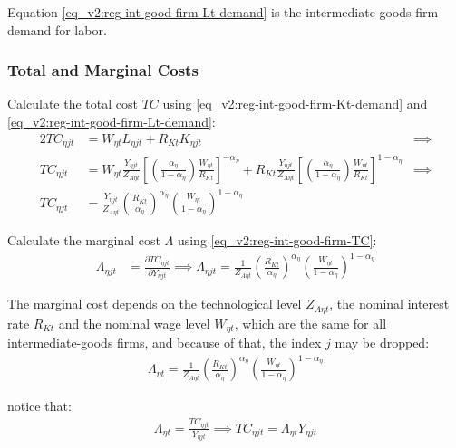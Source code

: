 \documentclass[../thesis.tex]{subfiles}
\begin{document}
Equation \ref{eq_v2:reg-int-good-firm-Lt-demand} is the intermediate-goods firm demand for labor.

\subsubsection*{Total and Marginal Costs}

Calculate the total cost $TC$ using \ref{eq_v2:reg-int-good-firm-Kt-demand} and \ref{eq_v2:reg-int-good-firm-Lt-demand}:
\begin{alignat}{2}
	TC_{\eta jt} & = W_{\eta t} L_{\eta jt} + R_{Kt} K_{\eta jt} &\implies \nonumber \\
	TC_{\eta jt} & = W_{\eta t} \frac{Y_{\eta jt}}{Z_{A\eta t}} \left[ \left( \frac{{\alpha_{\eta}}}{1-\alpha_{\eta}} \right) \frac{W_{\eta t}}{R_{Kt}} \right]^{-{\alpha_{\eta}}} + R_{Kt} \frac{Y_{\eta jt}}{Z_{A\eta t}} \left[ \left( \frac{{\alpha_{\eta}}}{1-\alpha_{\eta}} \right) \frac{W_{\eta t}}{R_{Kt}} \right]^{1-\alpha_{\eta}} &\implies \nonumber \\
	TC_{\eta jt} & = \frac{Y_{\eta jt}}{Z_{A\eta t}} \left( \frac{R_{Kt}}{{\alpha_{\eta}}} \right)^{{\alpha_{\eta}}} \left( \frac{W_{\eta t}}{1-\alpha_{\eta}} \right)^{1-\alpha_{\eta}} \label{eq_v2:reg-int-good-firm-TC}
\end{alignat}


Calculate the marginal cost $\Lambda$ using \ref{eq_v2:reg-int-good-firm-TC}: 
\begin{align}
	\Lambda_{\eta jt} & = \frac{\partial TC_{\eta jt}}{\partial Y_{\eta jt}} \implies 
	\Lambda_{\eta jt} = \frac{1}{Z_{A\eta t}} \left( \frac{R_{Kt}}{{\alpha_{\eta}}} \right)^{{\alpha_{\eta}}} \left( \frac{W_{\eta t}}{1-\alpha_{\eta}} \right)^{1-\alpha_{\eta}} \label{eq_v2:reg-int-good-firm-MC}
\end{align}

The marginal cost depends on the technological level $Z_{A\eta t}$, the nominal interest rate $R_{Kt}$ and the nominal wage level $W_{\eta t}$, which are the same for all intermediate-goods firms, and because of that, the index $j$ may be dropped:
\begin{align}
	\Lambda_{\eta t} = \frac{1}{Z_{A\eta t}} \left( \frac{R_{Kt}}{{\alpha_{\eta}}} \right)^{{\alpha_{\eta}}} \left( \frac{W_{\eta t}}{1-\alpha_{\eta}} \right)^{1-\alpha_{\eta}} \label{eq_v2:reg-int-good-firm-MC-2}
\end{align}

notice that:
\begin{align}
	\Lambda_{\eta t} = \frac{TC_{\eta jt}}{Y_{\eta jt}} \implies 
	TC_{\eta jt} = \Lambda_{\eta t} Y_{\eta jt} \label{eq_v2:reg-int-good-firm-TC-MC}
\end{align}
\end{document}
